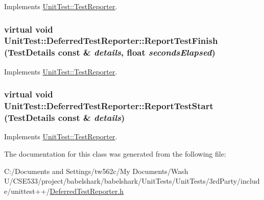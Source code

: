 Implements \hyperlink{class_unit_test_1_1_test_reporter_55195826cc03302f7a54f728c79102d5}{UnitTest::TestReporter}.\hypertarget{class_unit_test_1_1_deferred_test_reporter_77c9ec008f66a3dc3216e21082ef0215}{
\subsubsection[{ReportTestFinish}]{\setlength{\rightskip}{0pt plus 5cm}virtual void UnitTest::DeferredTestReporter::ReportTestFinish ({\bf TestDetails} const \& {\em details}, \/  float {\em secondsElapsed})}}
\label{class_unit_test_1_1_deferred_test_reporter_77c9ec008f66a3dc3216e21082ef0215}




Implements \hyperlink{class_unit_test_1_1_test_reporter_6492379c31985a77a22f1ccf684e44da}{UnitTest::TestReporter}.\hypertarget{class_unit_test_1_1_deferred_test_reporter_2aa55cb8b1cb292bbf71078100914d4a}{
\subsubsection[{ReportTestStart}]{\setlength{\rightskip}{0pt plus 5cm}virtual void UnitTest::DeferredTestReporter::ReportTestStart ({\bf TestDetails} const \& {\em details})}}
\label{class_unit_test_1_1_deferred_test_reporter_2aa55cb8b1cb292bbf71078100914d4a}




Implements \hyperlink{class_unit_test_1_1_test_reporter_94f1ab9311190188a2f96f8c2da785b1}{UnitTest::TestReporter}.

The documentation for this class was generated from the following file:\begin{CompactItemize}
\item 
C:/Documents and Settings/tw562c/My Documents/Wash U/CSE533/project/babelshark/babelshark/UnitTests/UnitTests/3rdParty/include/unittest++/\hyperlink{_deferred_test_reporter_8h}{DeferredTestReporter.h}\end{CompactItemize}

